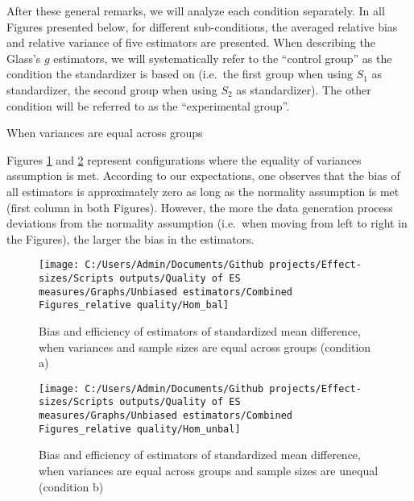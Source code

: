 \documentclass[
  12pt,
  french,
]{article}
\begin{document}
After these general remarks, we will analyze each condition separately.
In all Figures presented below, for different sub-conditions, the
averaged relative bias and relative variance of five estimators are
presented. When describing the Glass's \(g\) estimators, we will
systematically refer to the ``control group'' as the condition the
standardizer is based on (i.e.~the first group when using \(S_1\) as
standardizer, the second group when using \(S_2\) as standardizer). The
other condition will be referred to as the ``experimental group''.

When variances are equal across groups

Figures \ref{fig:idHombal} and \ref{fig:idHomunbal} represent
configurations where the equality of variances assumption is met.
According to our expectations, one observes that the bias of all
estimators is approximately zero as long as the normality assumption is
met (first column in both
Figures).
However, the more the data generation process deviations from the
normality assumption (i.e.~when moving from left to right in the
Figures), the larger the bias in the estimators.

\begin{figure}

{\centering \texttt{[image: C:/Users/Admin/Documents/Github projects/Effect-sizes/Scripts outputs/Quality of ES measures/Graphs/Unbiased estimators/Combined Figures\_relative quality/Hom\_bal]} 

}

\caption{Bias and efficiency of estimators of standardized mean difference, when variances and sample sizes are equal across groups (condition a)}\label{fig:idHombal}
\end{figure}

\begin{figure}

{\centering \texttt{[image: C:/Users/Admin/Documents/Github projects/Effect-sizes/Scripts outputs/Quality of ES measures/Graphs/Unbiased estimators/Combined Figures\_relative quality/Hom\_unbal]} 

}

\caption{Bias and efficiency of estimators of standardized mean difference, when variances are equal across groups and sample sizes are unequal (condition b)}\label{fig:idHomunbal}
\end{figure}
\end{document}
